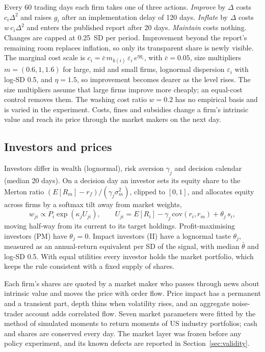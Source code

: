 \documentclass[11pt]{article}
\begin{document}
Every 60 trading days each firm takes one of three actions. \emph{Improve} by $\Delta$ costs $c_i\Delta^2$ and raises $g_i$ after an implementation delay of 120 days. \emph{Inflate} by $\Delta$ costs $w\,c_i\Delta^2$ and enters the published report after 20 days. \emph{Maintain} costs nothing. Changes are capped at 0.25~SD per period. Improvement beyond the report's remaining room replaces inflation, so only its transparent share is newly visible. The marginal cost scale is $c_i = \bar c\, m_{k(i)}\, \varepsilon_i\, e^{\eta g_i}$, with $\bar c = 0.05$, size multipliers $m = (0.6, 1, 1.6)$ for large, mid and small firms, lognormal dispersion $\varepsilon_i$ with log-SD 0.5, and $\eta = 1.5$, so improvement becomes dearer as the level rises. The size multipliers assume that large firms improve more cheaply; an equal-cost control removes them. The washing cost ratio $w = 0.2$ has no empirical basis and is varied in the experiment. Costs, fines and subsidies change a firm's intrinsic value and reach its price through the market makers on the next day.

\subsection{Investors and prices}

Investors differ in wealth (lognormal), risk aversion $\gamma_j$ and decision calendar (median 20 days). On a decision day an investor sets its equity share to the Merton ratio $(E[R_m]-r_f)/(\gamma_j \sigma_m^2)$, clipped to $[0,1]$, and allocates equity across firms by a softmax tilt away from market weights,
\begin{equation}
w_{ji} \propto P_i \exp(\kappa_j U_{ji}), \qquad U_{ji} = E[R_i] - \gamma_j\,\mathrm{cov}(r_i, r_m) + \theta_j\, s_i ,
\label{eq:utility}
\end{equation}
moving half-way from its current to its target holdings. Profit-maximising investors (PM) have $\theta_j = 0$. Impact investors (II) have a lognormal taste $\theta_j$, measured as an annual-return equivalent per SD of the signal, with median $\bar\theta$ and log-SD 0.5. With equal utilities every investor holds the market portfolio, which keeps the rule consistent with a fixed supply of shares.

Each firm's shares are quoted by a market maker who passes through news about intrinsic value and moves the price with order flow. Price impact has a permanent and a transient part, depth thins when volatility rises, and an aggregate noise-trader account adds correlated flow. Seven market parameters were fitted by the method of simulated moments to return moments of US industry portfolios; cash and shares are conserved every day. The market layer was frozen before any policy experiment, and its known defects are reported in Section~\ref{sec:validity}.
\end{document}
